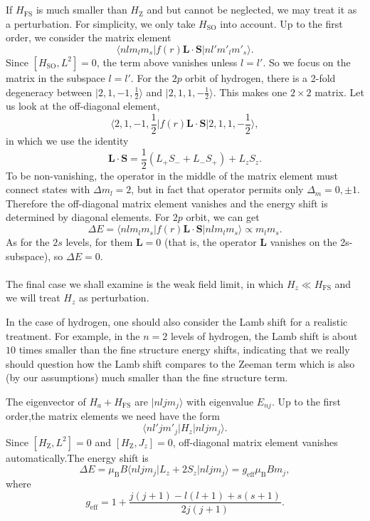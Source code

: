\\ \\
If $H_{\mathrm{FS}}$ is much smaller than $H_{\mathrm{Z}}$ and but cannot be neglected, we may treat it as a perturbation. For simplicity, we only take $H_{\mathrm{SO}}$ into account. Up to the first order, we consider the matrix element
\[\langle n l m_l m_s | f(r)\bm{L}\cdot\bm{S}| n l' m'_l m'_s\rangle.\]
Since $[H_{\mathrm{SO}},L^2] = 0$, the term above vanishes unless $l = l'$. So we focus on the matrix in the subspace $l = l'$. For the $2p$ orbit of hydrogen, there is a 2-fold degeneracy between $|2,1,-1,\frac{1}{2}\rangle$ and $|2,1,1,-\frac{1}{2}\rangle$.
This makes one $2 \times 2$ matrix. Let us look at the off-diagonal element,
\[\langle 2,1,-1,\frac{1}{2} | f(r)\bm{L}\cdot\bm{S}| 2,1,1,-\frac{1}{2}\rangle,\]
in which we use the identity
\[\bm{L}\cdot\bm{S} = \frac{1}{2}(L_+S_-+L_-S_+)+L_zS_z.\]
To be non-vanishing, the operator in the middle of the matrix element must connect states with $\Delta m_l = 2$, but in fact that operator permits only $\Delta_m = 0,\pm1$. Therefore the off-diagonal matrix element vanishes and the energy shift is determined by diagonal elements. For $2p$ orbit, we can get
\[\Delta E = \langle n l m_l m_s | f(r)\bm{L}\cdot\bm{S}| n l m_l m_s\rangle \propto m_lm_s.\]
As for the $2s$ levels, for them $\bm{L} = 0$ (that is, the operator $\bm{L}$ vanishes on the 2s-subspace), so $\Delta E = 0$.
\\ \\
The final case we shall examine is the weak field limit, in which $H_z \ll H_{\mathrm{FS}}$ and we will treat $H_z$ as perturbation.
\begin{note}
In the case of hydrogen, one should also consider the Lamb shift for a realistic treatment. For example, in the $n=2$ levels of hydrogen, the Lamb shift is about $10$ times smaller than the fine structure energy shifts, indicating that we really should question how the Lamb shift compares to the Zeeman term which is also (by our assumptions) much smaller than the fine structure term.
\end{note}
\noindent
The eigenvector of $H_a + H_{\mathrm{FS}}$ are $|nljm_j\rangle$ with eigenvalue $E_{nj}$. Up to the first order,the matrix elements we need have the form
\[\langle n l' j m'_j | H_z | n l j m_j\rangle.\]
Since $[H_{\mathrm{Z}},L^2] = 0$ and $[H_{\mathrm{Z}},J_z] = 0$, off-diagonal matrix element vanishes automatically.The energy shift is
\[\Delta E = \mu_{\mathrm{B}} B\langle n l j m_j | L_z + 2S_z | n l j m_j\rangle = g_{\mathrm{eff}} \mu_{\mathrm{B}} B m_j,\]
where
\[g_{\mathrm{eff}} = 1 + \frac{j(j+1)-l(l+1)+s(s+1)}{2j(j+1)}.\]

